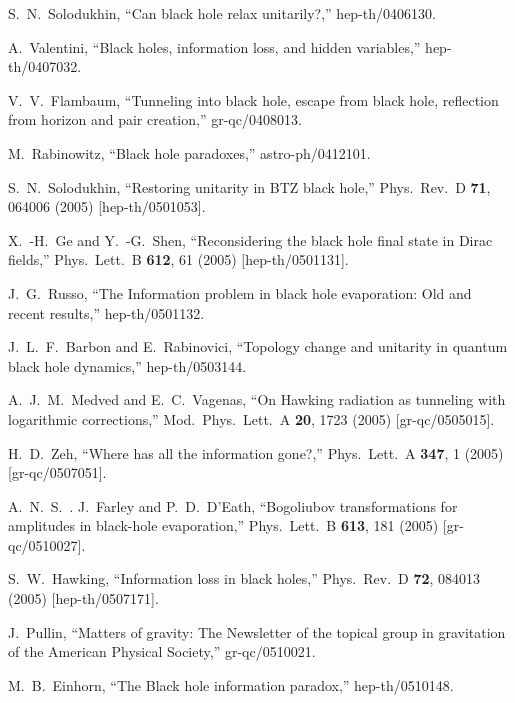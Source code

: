 \documentclass[12pt]{article}
\begin{document}
\begin{thebibliography}{99}
  S.~N.~Solodukhin,
  ``Can black hole relax unitarily?,''
  hep-th/0406130.

  A.~Valentini,
  ``Black holes, information loss, and hidden variables,''
  hep-th/0407032.

  V.~V.~Flambaum,
  ``Tunneling into black hole, escape from black hole, reflection from horizon and pair creation,''
  gr-qc/0408013.

  M.~Rabinowitz,
  ``Black hole paradoxes,''
  astro-ph/0412101.

  S.~N.~Solodukhin,
  ``Restoring unitarity in BTZ black hole,''
  Phys.\ Rev.\ D {\bf 71}, 064006 (2005)
  [hep-th/0501053].

  X.~-H.~Ge and Y.~-G.~Shen,
  ``Reconsidering the black hole final state in Dirac fields,''
  Phys.\ Lett.\ B {\bf 612}, 61 (2005)
  [hep-th/0501131].

  J.~G.~Russo,
  ``The Information problem in black hole evaporation: Old and recent results,''
  hep-th/0501132.

  J.~L.~F.~Barbon and E.~Rabinovici,
  ``Topology change and unitarity in quantum black hole dynamics,''
  hep-th/0503144.

  A.~J.~M.~Medved and E.~C.~Vagenas,
  ``On Hawking radiation as tunneling with logarithmic corrections,''
  Mod.\ Phys.\ Lett.\ A {\bf 20}, 1723 (2005)
  [gr-qc/0505015].

  H.~D.~Zeh,
  ``Where has all the information gone?,''
  Phys.\ Lett.\ A {\bf 347}, 1 (2005)
  [gr-qc/0507051].

  A.~N.~S.~. J.~Farley and P.~D.~D'Eath,
  ``Bogoliubov transformations for amplitudes in black-hole evaporation,''
  Phys.\ Lett.\ B {\bf 613}, 181 (2005)
  [gr-qc/0510027].

  S.~W.~Hawking,
  ``Information loss in black holes,''
  Phys.\ Rev.\ D {\bf 72}, 084013 (2005)
  [hep-th/0507171].

  J.~Pullin,
  ``Matters of gravity: The Newsletter of the topical group in gravitation of the American Physical Society,''
  gr-qc/0510021.

  M.~B.~Einhorn,
  ``The Black hole information paradox,''
  hep-th/0510148.


\end{thebibliography}
\end{document}
